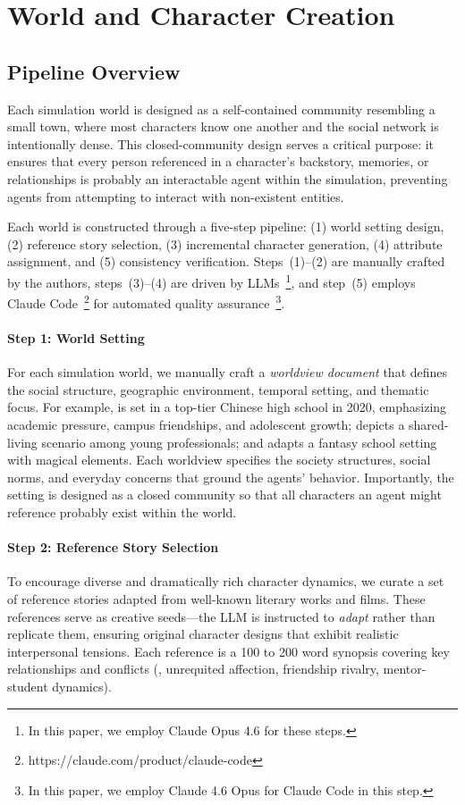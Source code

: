 \section{World and Character Creation}
\label{app:creation}

\subsection{Pipeline Overview}
\label{app:creation_process}

Each simulation world is designed as a self-contained community resembling a small town,
where most characters know one another and the social network is intentionally dense.
This closed-community design serves a critical purpose:
it ensures that every person referenced in a character's backstory, memories, or relationships is probably an interactable agent within the simulation,
preventing agents from attempting to interact with non-existent entities.

Each world is constructed through a five-step pipeline:
(1) world setting design,
(2) reference story selection,
(3) incremental character generation,
(4) attribute assignment,
and (5) consistency verification.
Steps~(1)--(2) are manually crafted by the authors,
steps~(3)--(4) are driven by LLMs~\footnote{In this paper, we employ Claude Opus 4.6 for these steps.},
and step~(5) employs Claude Code~\footnote{https://claude.com/product/claude-code} for automated quality assurance~\footnote{In this paper, we employ Claude 4.6 Opus for Claude Code in this step.}.

\paragraph{Step 1: World Setting}
For each simulation world, we manually craft a \textit{worldview document} that defines the social structure, geographic environment, temporal setting, and thematic focus.
For example, \campus{} is set in a top-tier Chinese high school in 2020, emphasizing academic pressure, campus friendships, and adolescent growth;
\apartment{} depicts a shared-living scenario among young professionals;
and \academy{} adapts a fantasy school setting with magical elements.
Each worldview specifies the society structures, social norms, and everyday concerns that ground the agents' behavior.
Importantly, the setting is designed as a closed community so that all characters an agent might reference probably exist within the world.

\paragraph{Step 2: Reference Story Selection}
To encourage diverse and dramatically rich character dynamics, we curate a set of reference stories adapted from well-known literary works and films.
These references serve as creative seeds---the LLM is instructed to \textit{adapt} rather than replicate them, ensuring original character designs that exhibit realistic interpersonal tensions.
Each reference is a 100 to 200 word synopsis covering key relationships and conflicts (\eg, unrequited affection, friendship rivalry, mentor-student dynamics).

